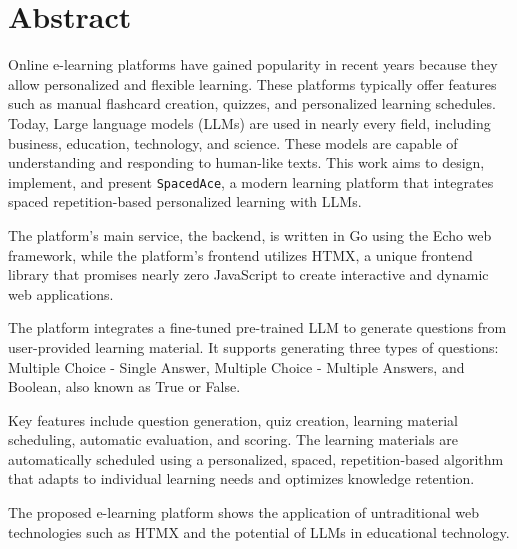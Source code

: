 \chapter*{Abstract}

Online e-learning platforms have gained popularity in recent years because they allow personalized and flexible learning. These platforms typically offer features such as manual flashcard creation, quizzes, and personalized learning schedules. Today, Large language models (LLMs) are used in nearly every field, including business, education, technology, and science. These models are capable of understanding and responding to human-like texts. This work aims to design, implement, and present \texttt{SpacedAce}, a modern learning platform that integrates spaced repetition-based personalized learning with LLMs.

The platform's main service, the backend, is written in Go using the Echo web framework, while the platform's frontend utilizes HTMX, a unique frontend library that promises nearly zero JavaScript to create interactive and dynamic web applications.

The platform integrates a fine-tuned pre-trained LLM to generate questions from user-provided learning material. It supports generating three types of questions: Multiple Choice - Single Answer, Multiple Choice - Multiple Answers, and Boolean, also known as True or False.

Key features include question generation, quiz creation, learning material scheduling, automatic evaluation, and scoring. The learning materials are automatically scheduled using a personalized, spaced, repetition-based algorithm that adapts to individual learning needs and optimizes knowledge retention.

The proposed e-learning platform shows the application of untraditional web technologies such as HTMX and the potential of LLMs in educational technology.

\vfill
\selectthesislanguage

\setcounter{romanPage}{\value{page}}
